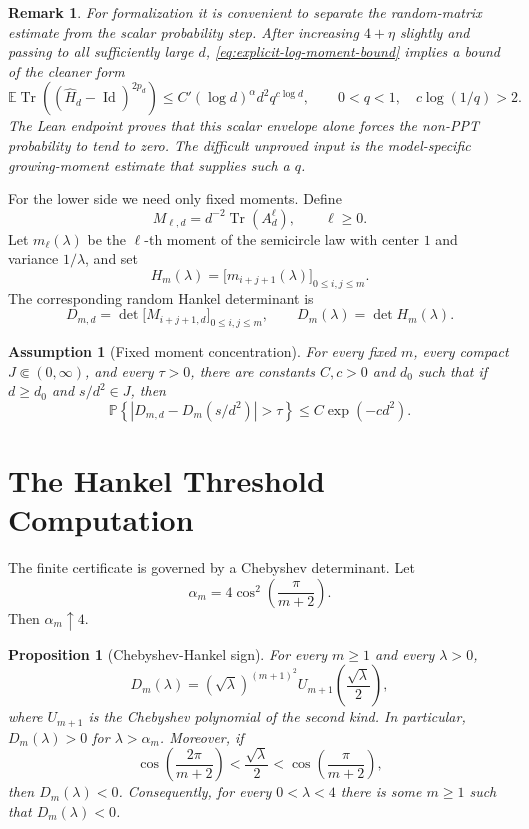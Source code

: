 \documentclass[11pt,reqno]{amsart}
\newtheorem{proposition}[theorem]{Proposition}
\newtheorem{assumption}[theorem]{Assumption}
\newtheorem{remark}[theorem]{Remark}
\newcommand{\PP}{\mathbb P}
\newcommand{\EE}{\mathbb E}
\newcommand{\Tr}{\operatorname{Tr}}
\newcommand{\Id}{\operatorname{Id}}
\newcommand{\abs}[1]{\left\lvert #1\right\rvert}
\begin{document}
\begin{remark}
For formalization it is convenient to separate the random-matrix estimate
from the scalar probability step.  After increasing \(4+\eta\) slightly and
passing to all sufficiently large \(d\), \eqref{eq:explicit-log-moment-bound}
implies a bound of the cleaner form
\begin{equation}
\label{eq:paper-shape-log-bound}
  \EE\Tr\left((\widehat H_d-\Id)^{2p_d}\right)
  \le
  C'(\log d)^\alpha d^2 q^{c\log d},
  \qquad 0<q<1,\quad c\log(1/q)>2.
\end{equation}
The Lean endpoint proves that this scalar envelope alone forces the
non-PPT probability to tend to zero.  The difficult unproved input is the
model-specific growing-moment estimate that supplies such a \(q\).
\end{remark}

For the lower side we need only fixed moments.  Define
\[
  M_{\ell,d}=d^{-2}\Tr(A_d^\ell),
  \qquad \ell\ge0.
\]
Let \(m_\ell(\lambda)\) be the \(\ell\)-th moment of the semicircle law with
center \(1\) and variance \(1/\lambda\), and set
\[
  H_m(\lambda)=\bigl[m_{i+j+1}(\lambda)\bigr]_{0\le i,j\le m}.
\]
The corresponding random Hankel determinant is
\[
  D_{m,d}=\det\bigl[M_{i+j+1,d}\bigr]_{0\le i,j\le m},
  \qquad
  D_m(\lambda)=\det H_m(\lambda).
\]

\begin{assumption}[Fixed moment concentration]
\label{ass:moment-concentration}
For every fixed \(m\), every compact \(J\Subset(0,\infty)\), and every
\(\tau>0\), there are constants \(C,c>0\) and \(d_0\) such that if
\(d\ge d_0\) and \(s/d^2\in J\), then
\[
  \PP\left\{
    \abs{D_{m,d}-D_m(s/d^2)}>\tau
  \right\}
  \le C\exp(-c d^2).
\]
\end{assumption}

\section{The Hankel Threshold Computation}

The finite certificate is governed by a Chebyshev determinant.  Let
\[
  \alpha_m=4\cos^2\left(\frac{\pi}{m+2}\right).
\]
Then \(\alpha_m\uparrow4\).

\begin{proposition}[Chebyshev-Hankel sign]
\label{prop:chebyshev-sign}
For every \(m\ge1\) and every \(\lambda>0\),
\[
  D_m(\lambda)
  =
  (\sqrt\lambda)^{(m+1)^2}
  U_{m+1}\left(\frac{\sqrt\lambda}{2}\right),
\]
where \(U_{m+1}\) is the Chebyshev polynomial of the second kind.  In
particular, \(D_m(\lambda)>0\) for \(\lambda>\alpha_m\).
Moreover, if
\[
  \cos\left(\frac{2\pi}{m+2}\right)
  <
  \frac{\sqrt\lambda}{2}
  <
  \cos\left(\frac{\pi}{m+2}\right),
\]
then \(D_m(\lambda)<0\).  Consequently, for every \(0<\lambda<4\) there is
some \(m\ge1\) such that \(D_m(\lambda)<0\).
\end{proposition}
\end{document}
